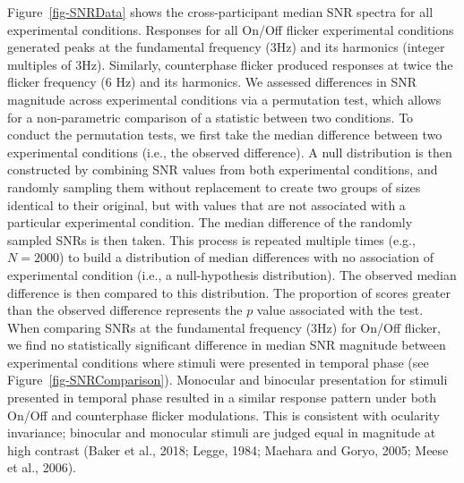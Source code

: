 \documentclass[
  12pt,
]{article}
\begin{document}
Figure~\ref{fig-SNRData} shows the cross-participant median SNR spectra
for all experimental conditions. Responses for all On/Off flicker
experimental conditions generated peaks at the fundamental frequency
(3Hz) and its harmonics (integer multiples of 3Hz). Similarly,
counterphase flicker produced responses at twice the flicker frequency
(6 Hz) and its harmonics. We assessed differences in SNR magnitude
across experimental conditions via a permutation test, which allows for
a non-parametric comparison of a statistic between two conditions. To
conduct the permutation tests, we first take the median difference
between two experimental conditions (i.e., the observed difference). A
null distribution is then constructed by combining SNR values from both
experimental conditions, and randomly sampling them without replacement
to create two groups of sizes identical to their original, but with
values that are not associated with a particular experimental condition.
The median difference of the randomly sampled SNRs is then taken. This
process is repeated multiple times (e.g., \(N = 2000\)) to build a
distribution of median differences with no association of experimental
condition (i.e., a null-hypothesis distribution). The observed median
difference is then compared to this distribution. The proportion of
scores greater than the observed difference represents the \(p\) value
associated with the test. When comparing SNRs at the fundamental
frequency (3Hz) for On/Off flicker, we find no statistically significant
difference in median SNR magnitude between experimental conditions where
stimuli were presented in temporal phase (see
Figure~\ref{fig-SNRComparison}). Monocular and binocular presentation
for stimuli presented in temporal phase resulted in a similar response
pattern under both On/Off and counterphase flicker modulations. This is
consistent with ocularity invariance; binocular and monocular stimuli
are judged equal in magnitude at high contrast (Baker et al., 2018;
Legge, 1984; Maehara and Goryo, 2005; Meese et al., 2006).
\end{document}
